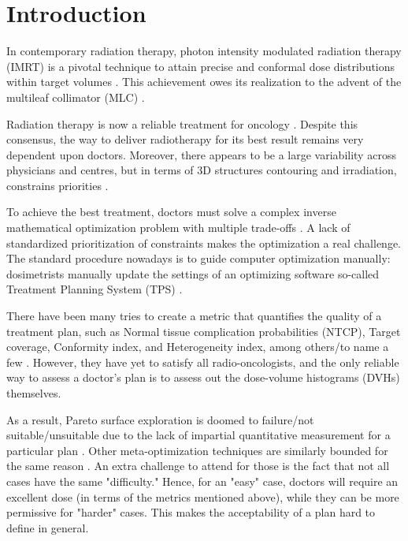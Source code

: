 \section{Introduction}
In contemporary radiation therapy, photon intensity modulated radiation therapy (IMRT) is a pivotal technique to attain precise and conformal dose distributions within target volumes \cite{xu_comparison_2017}.
This achievement owes its realization to the advent of the multileaf collimator (MLC) \cite{galvin_characterization_1993}.

Radiation therapy is now a reliable treatment for oncology \cite{valentini_survival_2009}.
Despite this consensus, the way to deliver radiotherapy for its best result remains very dependent upon doctors.
Moreover, there appears to be a large variability across physicians and centres, but in terms of 3D structures contouring and irradiation, constrains priorities \cite{variability_2021}.

To achieve the best treatment, doctors must solve a complex inverse mathematical optimization problem with multiple trade-offs \cite{oelfke_inverse_2001} \cite{webb_physical_2003}.
A lack of standardized prioritization of constraints makes the optimization a real challenge.
The standard procedure nowadays is to guide computer optimization manually: dosimetrists manually update the settings of an optimizing software so-called Treatment Planning System (TPS) \cite{planification_website}.

There have been many tries to create a metric that quantifies the quality of a treatment plan, such as Normal tissue complication probabilities (NTCP), Target coverage, Conformity index, and Heterogeneity index, among others/to name a few \cite{lyman_normal_1992} \cite{li_input_2022}.\label{metrics}
However, they have yet to satisfy all radio-oncologists, and the only reliable way to assess a doctor's plan is to assess out the dose-volume histograms (DVHs) themselves.

As a result, Pareto surface exploration is doomed to failure/not suitable/unsuitable due to the lack of impartial quantitative measurement for a particular plan \cite{huang_pareto_2021}.
Other meta-optimization techniques are similarly bounded for the same reason \cite{wu_optimization_2001} \cite{xing_optimization_1999}.
An extra challenge to attend for those is the fact that not all cases have the same "difficulty."
Hence, for an "easy" case, doctors will require an excellent dose (in terms of the metrics mentioned above), while they can be more permissive for "harder" cases.
This makes the acceptability of a plan hard to define in general.

